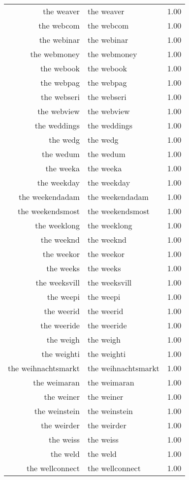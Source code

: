 \begin{table}[ht]
\begin{tabular}{rlr}
  the weaver & the weaver & 1.00 \\ 
  the webcom & the webcom & 1.00 \\ 
  the webinar & the webinar & 1.00 \\ 
  the webmoney & the webmoney & 1.00 \\ 
  the webook & the webook & 1.00 \\ 
  the webpag & the webpag & 1.00 \\ 
  the webseri & the webseri & 1.00 \\ 
  the webview & the webview & 1.00 \\ 
  the weddings & the weddings & 1.00 \\ 
  the wedg & the wedg & 1.00 \\ 
  the wedum & the wedum & 1.00 \\ 
  the weeka & the weeka & 1.00 \\ 
  the weekday & the weekday & 1.00 \\ 
  the weekendadam & the weekendadam & 1.00 \\ 
  the weekendsmost & the weekendsmost & 1.00 \\ 
  the weeklong & the weeklong & 1.00 \\ 
  the weeknd & the weeknd & 1.00 \\ 
  the weekor & the weekor & 1.00 \\ 
  the weeks & the weeks & 1.00 \\ 
  the weeksvill & the weeksvill & 1.00 \\ 
  the weepi & the weepi & 1.00 \\ 
  the weerid & the weerid & 1.00 \\ 
  the weeride & the weeride & 1.00 \\ 
  the weigh & the weigh & 1.00 \\ 
  the weighti & the weighti & 1.00 \\ 
  the weihnachtsmarkt & the weihnachtsmarkt & 1.00 \\ 
  the weimaran & the weimaran & 1.00 \\ 
  the weiner & the weiner & 1.00 \\ 
  the weinstein & the weinstein & 1.00 \\ 
  the weirder & the weirder & 1.00 \\ 
  the weiss & the weiss & 1.00 \\ 
  the weld & the weld & 1.00 \\ 
  the wellconnect & the wellconnect & 1.00 \\ 

\end{tabular}
\end{table}
